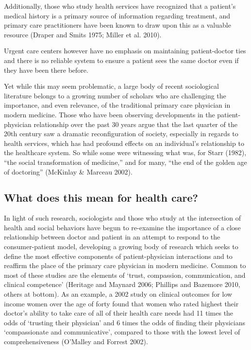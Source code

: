\documentclass[12pt,twoside]{reedthesis}
\begin{document}
  Additionally, those who study health services have recognized that a
  patient's medical history is a primary source of information regarding
  treatment, and primary care practitioners have been known to draw upon
  this as a valuable resource (Draper and Smits 1975; Miller et al. 2010).
  
  Urgent care centers however have no emphasis on maintaining
  patient-doctor ties and there is no reliable system to ensure a patient
  sees the same doctor even if they have been there before.
  
  Yet while this may seem problematic, a large body of recent sociological
  literature belongs to a growing number of scholars who are challenging
  the importance, and even relevance, of the traditional primary care
  physician in modern medicine. Those who have been observing developments
  in the patient-physician relationship over the past 30 years argue that
  the last quarter of the 20th century saw a dramatic reconfiguration of
  society, especially in regards to health services, which has had
  profound effects on an individual's relationship to the healthcare
  system. So while some were witnessing what was, for Starr (1982), ``the
  social transformation of medicine,'' and for many, ``the end of the
  golden age of doctoring'' (McKinlay \& Marceau 2002).
  
  \subsection*{What does this mean for health
  care?}\label{what-does-this-mean-for-health-care}
  
  In light of such research, sociologists and those who study at the
  intersection of health and social behaviors have begun to re-examine the
  importance of a close relationship between doctor and patient in an
  attempt to respond to the consumer-patient model, developing a growing
  body of research which seeks to define the most effective components of
  patient-physician interactions and to reaffirm the place of the primary
  care physician in modern medicine. Common to most of these studies are
  the elements of `trust, compassion, communication, and clinical
  competence' (Heritage and Maynard 2006; Phillips and Bazemore 2010,
  others at bottom). As an example, a 2002 study on clinical outcomes for
  low income women over the age of forty found that women who rated
  highest their doctor's ability to take care of all of their health care
  needs had 11 times the odds of `trusting their physician' and 6 times
  the odds of finding their physicians `compassionate and communicative',
  compared to those with the lowest level of comprehensiveness (O'Malley
  and Forrest 2002).
  
\end{document}
